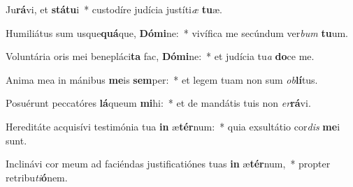 \item Ju\textbf{rá}vi, et \textbf{stá}\textbf{tu}i~* custodíre judícia justíti\textit{æ} \textbf{tu}æ.
\item Humiliátus sum usque\textbf{quá}que, \textbf{Dó}\textbf{mi}ne:~* vivífica me secúndum ver\textit{bum} \textbf{tu}um.
\item Voluntária oris mei benepláci\textbf{ta} fac, \textbf{Dó}\textbf{mi}ne:~* et judícia tu\textit{a} \textbf{do}ce me.
\item Anima mea in mánibus \textbf{me}is \textbf{sem}per:~* et legem tuam non sum \textit{ob}\textbf{lí}tus.
\item Posuérunt peccatóres \textbf{lá}queum \textbf{mi}hi:~* et de mandátis tuis non \textit{er}\textbf{rá}vi.
\item Hereditáte acquisívi testimónia tua \textbf{in} æ\textbf{tér}num:~* quia exsultátio cor\textit{dis} \textbf{me}i sunt.
\item Inclinávi cor meum ad faciéndas justificatiónes tuas \textbf{in} æ\textbf{tér}num,~* propter retribu\textit{ti}\textbf{ó}nem.
